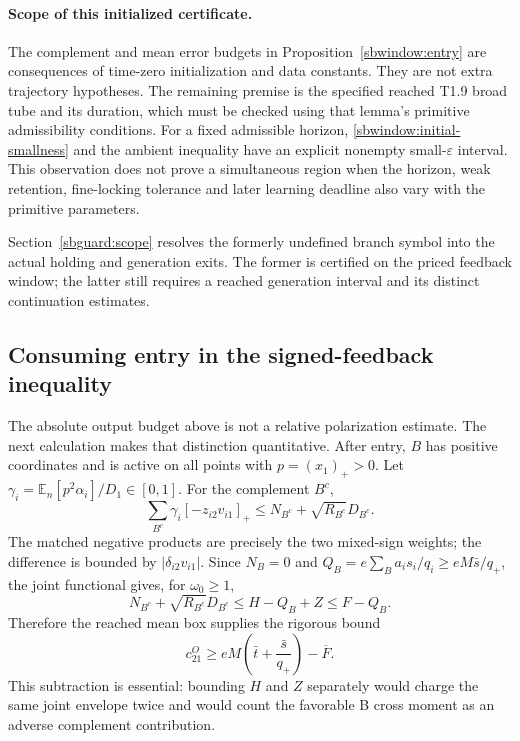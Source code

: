 \documentclass{article} %
\theoremstyle{plain}
\theoremstyle{definition}
\theoremstyle{remark}
\begin{document}
\paragraph{Scope of this initialized certificate.}
The complement and mean error budgets in Proposition~\ref{sbwindow:entry}
are consequences of time-zero initialization and data constants. They
are not extra trajectory hypotheses. The remaining premise is the
specified reached T1.9 broad tube and its duration, which must be checked
using that lemma's primitive admissibility conditions. For a fixed
admissible horizon, \eqref{sbwindow:initial-smallness} and the ambient
inequality have an explicit nonempty small-$\varepsilon$ interval.
This observation does not prove a simultaneous region when the horizon,
weak retention, fine-locking tolerance and later learning deadline also
vary with the primitive parameters.

Section~\ref{sbguard:scope} resolves the formerly undefined branch
symbol into the actual holding and generation exits. The former is
certified on the priced feedback window; the latter still requires a
reached generation interval and its distinct continuation estimates.

\subsection{Consuming entry in the signed-feedback inequality}

The absolute output budget above is not a relative polarization estimate.
The next calculation makes that distinction quantitative. After entry,
$B$ has positive coordinates and is active on all points with $p=(x_1)_+>0$.
Let $\gamma_i=\mathbb E_n[p^2\alpha_i]/D_1\in[0,1]$. For the
complement $B^c$,
\[
 \sum_{B^c}\gamma_i[-z_{i2}v_{i1}]_+
 \le N_{B^c}+\sqrt{R_{B^c}}D_{B^c}.
\]
The matched negative products are precisely the two mixed-sign weights;
the difference is bounded by $|\delta_{i2}v_{i1}|$.
Since $N_B=0$ and
$Q_B=e\sum_Ba_is_i/q_i\ge eM\bar s/q_+$, the joint functional gives,
for $\omega_0\ge1$,
\[
 N_{B^c}+\sqrt{R_{B^c}}D_{B^c}
 \le H-Q_B+Z\le F-Q_B.
\]
Therefore the reached mean box supplies the rigorous bound
\begin{equation}\label{sbwindow:feedback}
 c_{21}^O\ge eM\left(\bar t+\frac{\bar s}{q_+}\right)-\overline F.
\end{equation}
This subtraction is essential: bounding $H$ and $Z$ separately would
charge the same joint envelope twice and would count the favorable B
cross moment as an adverse complement contribution.
\end{document}
